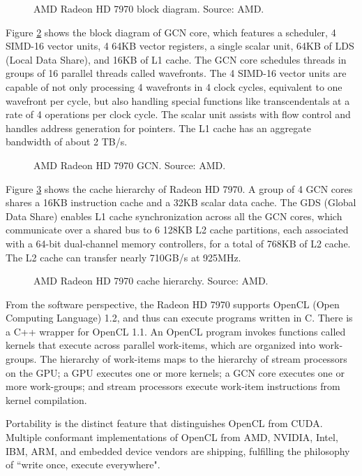 \begin{figure}[t]
\centering
\caption{AMD Radeon HD 7970 block diagram. Source: AMD.}
\label{idock:RadeonHD7970BlockDiagram}
\end{figure}

Figure \ref{idock:RadeonHD7970GCN} shows the block diagram of GCN core, which features a scheduler, 4 SIMD-16 vector units, 4 64KB vector registers, a single scalar unit, 64KB of LDS (Local Data Share), and 16KB of L1 cache. The GCN core schedules threads in groups of 16 parallel threads called wavefronts. The 4 SIMD-16 vector units are capable of not only processing 4 wavefronts in 4 clock cycles, equivalent to one wavefront per cycle, but also handling special functions like transcendentals at a rate of 4 operations per clock cycle. The scalar unit assists with flow control and handles address generation for pointers. The L1 cache has an aggregate bandwidth of about 2 TB/s.

\begin{figure}
\centering
\caption{AMD Radeon HD 7970 GCN. Source: AMD.}
\label{idock:RadeonHD7970GCN}
\end{figure}

Figure \ref{idock:RadeonHD7970CacheHierarchy} shows the cache hierarchy of Radeon HD 7970. A group of 4 GCN cores shares a 16KB instruction cache and a 32KB scalar data cache. The GDS (Global Data Share) enables L1 cache synchronization across all the GCN cores, which communicate over a shared bus to 6 128KB L2 cache partitions, each associated with a 64-bit dual-channel memory controllers, for a total of 768KB of L2 cache. The L2 cache can transfer nearly 710GB/s at 925MHz.

\begin{figure}
\centering
\caption{AMD Radeon HD 7970 cache hierarchy. Source: AMD.}
\label{idock:RadeonHD7970CacheHierarchy}
\end{figure}

From the software perspective, the Radeon HD 7970 supports OpenCL (Open Computing Language) 1.2, and thus can execute programs written in C. There is a C++ wrapper for OpenCL 1.1. An OpenCL program invokes functions called kernels that execute across parallel work-items, which are organized into work-groups. The hierarchy of work-items maps to the hierarchy of stream processors on the GPU; a GPU executes one or more kernels; a GCN core executes one or more work-groups; and stream processors execute work-item instructions from kernel compilation.

Portability is the distinct feature that distinguishes OpenCL from CUDA. Multiple conformant implementations of OpenCL from AMD, NVIDIA, Intel, IBM, ARM, and embedded device vendors are shipping, fulfilling the philosophy of ``write once, execute everywhere".

\chapterend

